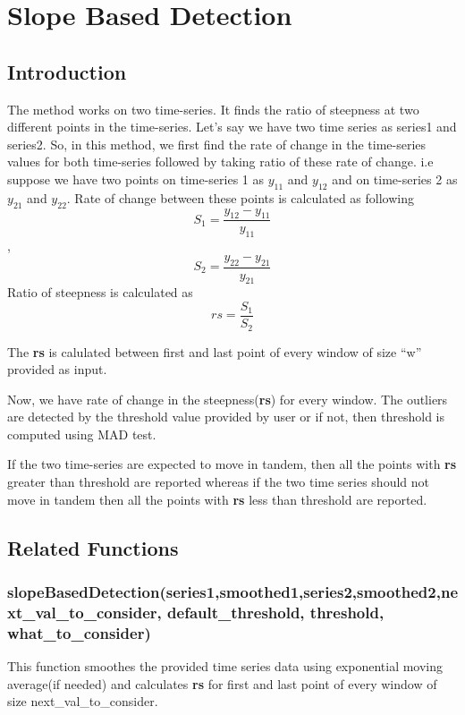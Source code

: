 \chapter{Slope Based Detection}

\section{Introduction}

The method works on two time-series. It finds the ratio of steepness 
at two different points in the time-series. Let's say we have two 
time series as series1 and series2. So, in this method, we first find 
the rate of change in the time-series values for both time-series followed 
by taking ratio of these rate of change. i.e  suppose we have two points on 
time-series 1 as $y_{11}$ and $y_{12}$ and on time-series 2 as $y_{21}$ and $y_{22}$. 
Rate of change between these points is calculated as following
 $$S_1=\frac{y_{12}-y_{11}}{y_{11}}$$
 ,
  $$S_2=\frac{y_{22}-y_{21}}{y_{21}}$$
 Ratio of steepness is calculated as
 $$rs = \frac{S_1}{S_2}$$

The \textbf{rs} is calulated between first and last point of every window of
size ``w'' provided as input. 

Now, we have rate of change in the steepness(\textbf{rs}) for every window. 
The outliers are detected by the threshold value provided by user or if not, 
then threshold is computed using MAD test.

If the two time-series are expected to move in tandem, then all the points 
with \textbf{rs} greater than threshold are reported whereas if the two time 
series should not move in tandem then all the points with \textbf{rs} less than 
threshold are reported. 

\section{Related Functions}

\subsection{slopeBasedDetection(series1,smoothed1,series2,smoothed2,next{\_}val{\_}to{\_}consider, default{\_}threshold, threshold, what{\_}to{\_}consider)}

This function smoothes the provided time series data using exponential moving average(if needed) and 
calculates \textbf{rs} for first and last point of every window of size next{\_}val{\_}to{\_}consider.

